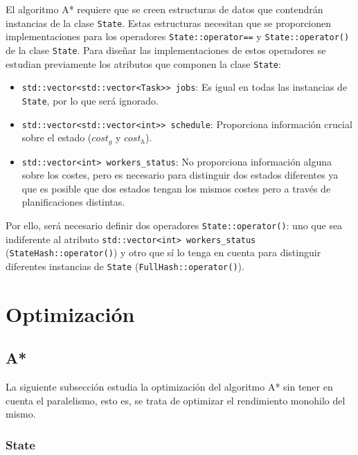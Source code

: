 El algoritmo A* requiere que se creen estructuras de datos que contendrán instancias
de la clase \lstinline{State}.
Estas estructuras necesitan que se proporcionen implementaciones para los operadores
\lstinline{State::operator==} y \lstinline{State::operator()} de la clase \lstinline{State}.
Para diseñar las implementaciones de estos operadores
se estudian previamente los atributos que componen la clase \lstinline{State}:

\begin{itemize}[itemsep=0.25px]
    \item \lstinline{std::vector<std::vector<Task>> jobs}: Es igual en todas las
    instancias de \lstinline{State}, por lo que será ignorado.
    \item \lstinline{std::vector<std::vector<int>> schedule}: Proporciona
    información crucial sobre el estado ($cost_g$ y $cost_h$).
    \item \lstinline{std::vector<int> workers_status}: No proporciona
    información alguna sobre los costes,
    pero es necesario para distinguir dos estados diferentes
    ya que es posible que dos estados tengan los mismos costes pero a través de
    planificaciones distintas.
\end{itemize}

Por ello, será necesario definir dos operadores \lstinline{State::operator()}:
uno que sea indiferente al atributo \lstinline{std::vector<int> workers_status}
(\lstinline{StateHash::operator()})
y otro que sí lo tenga en cuenta para distinguir diferentes instancias de \lstinline{State}
(\lstinline{FullHash::operator()}).

\pagebreak

\section{Optimización}

\subsection{A*}

La siguiente subsección estudia la optimización
del algoritmo A* sin tener en cuenta el paralelismo,
esto es, se trata de optimizar el rendimiento
monohilo del mismo.

\subsubsection{State}

